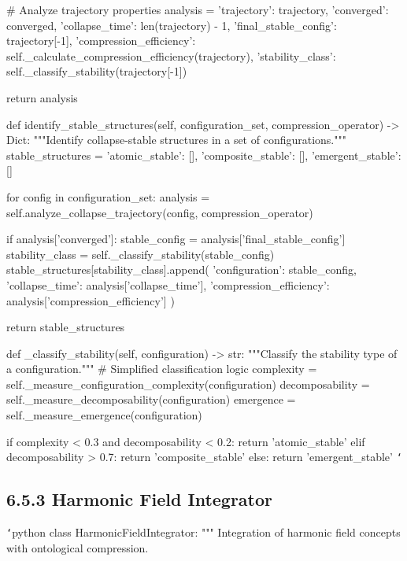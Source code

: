         \# Analyze trajectory properties
        analysis = {
            'trajectory': trajectory,
            'converged': converged,
            'collapse_time': len(trajectory) - 1,
            'final_stable_config': trajectory[-1],
            'compression_efficiency': self._calculate_compression_efficiency(trajectory),
            'stability_class': self._classify_stability(trajectory[-1])
        }
        
        return analysis
        
    def identify_stable_structures(self, configuration_set, compression_operator) -> Dict:
        """Identify collapse-stable structures in a set of configurations."""
        stable_structures = {
            'atomic_stable': [],
            'composite_stable': [],
            'emergent_stable': []
        }
        
        for config in configuration_set:
            analysis = self.analyze_collapse_trajectory(config, compression_operator)
            
            if analysis['converged']:
                stable_config = analysis['final_stable_config']
                stability_class = self._classify_stability(stable_config)
                stable_structures[stability_class].append({
                    'configuration': stable_config,
                    'collapse_time': analysis['collapse_time'],
                    'compression_efficiency': analysis['compression_efficiency']
                })
                
        return stable_structures
        
    def _classify_stability(self, configuration) -> str:
        """Classify the stability type of a configuration."""
        \# Simplified classification logic
        complexity = self._measure_configuration_complexity(configuration)
        decomposability = self._measure_decomposability(configuration)
        emergence = self._measure_emergence(configuration)
        
        if complexity < 0.3 and decomposability < 0.2:
            return 'atomic_stable'
        elif decomposability > 0.7:
            return 'composite_stable'
        else:
            return 'emergent_stable'
\texttt{`}

\subsection{6.5.3 Harmonic Field Integrator}

\texttt{`}python
class HarmonicFieldIntegrator:
    """
    Integration of harmonic field concepts with ontological compression.
    
